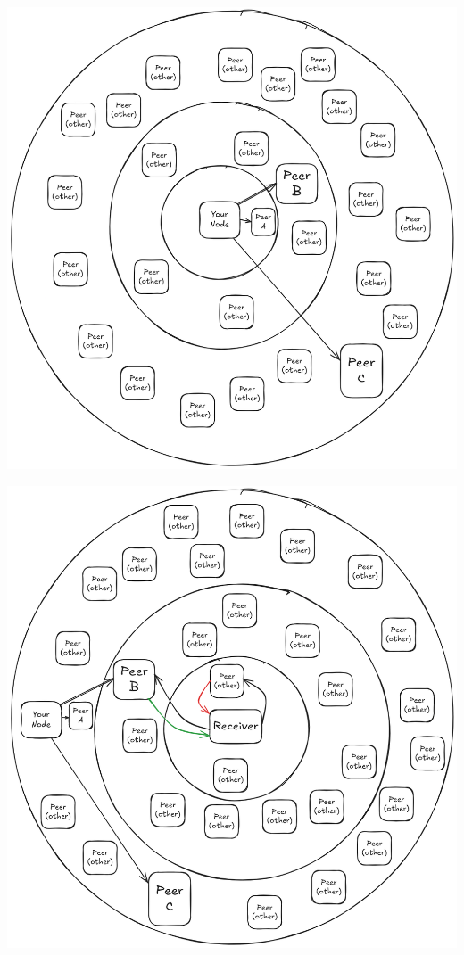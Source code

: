 \begin{frame}
  \centering
  \includegraphics[height=\textheight]{img/distribution-send.png}
\end{frame}

\begin{frame}
  \centering
  \includegraphics[height=\textheight]{img/distribution-receive.png}
\end{frame}
